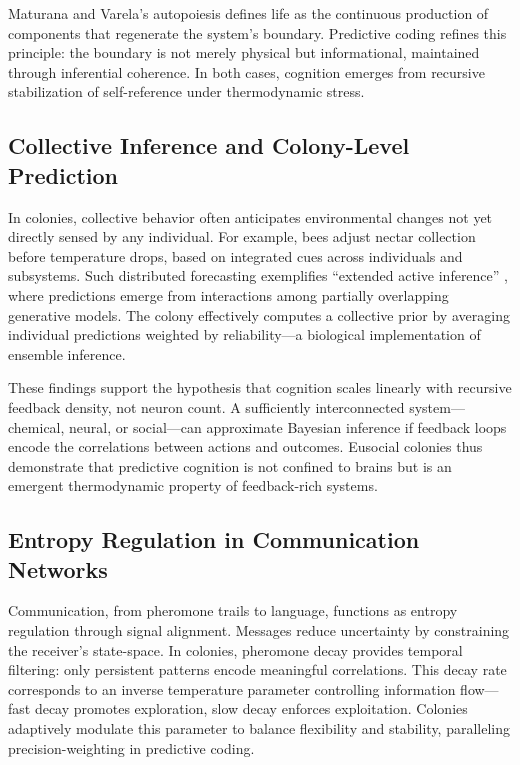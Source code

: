 \documentclass[11pt,a4paper]{article}
\begin{document}
Maturana and Varela’s autopoiesis \citep{MaturanaVarela1980Autopoiesis} defines life as the continuous production of components that regenerate the system’s boundary.  Predictive coding refines this principle: the boundary is not merely physical but informational, maintained through inferential coherence.  In both cases, cognition emerges from recursive stabilization of self-reference under thermodynamic stress.

\subsection{Collective Inference and Colony-Level Prediction}

In colonies, collective behavior often anticipates environmental changes not yet directly sensed by any individual.  For example, bees adjust nectar collection before temperature drops, based on integrated cues across individuals and subsystems.  Such distributed forecasting exemplifies “extended active inference” \citep{Constant2021EnactiveDynamicSocial}, where predictions emerge from interactions among partially overlapping generative models.  The colony effectively computes a collective prior by averaging individual predictions weighted by reliability—a biological implementation of ensemble inference.

These findings support the hypothesis that cognition scales linearly with recursive feedback density, not neuron count.  A sufficiently interconnected system—chemical, neural, or social—can approximate Bayesian inference if feedback loops encode the correlations between actions and outcomes.  Eusocial colonies thus demonstrate that predictive cognition is not confined to brains but is an emergent thermodynamic property of feedback-rich systems.

\subsection{Entropy Regulation in Communication Networks}

Communication, from pheromone trails to language, functions as entropy regulation through signal alignment.  Messages reduce uncertainty by constraining the receiver’s state-space.  In colonies, pheromone decay provides temporal filtering: only persistent patterns encode meaningful correlations.  This decay rate corresponds to an inverse temperature parameter controlling information flow—fast decay promotes exploration, slow decay enforces exploitation.  Colonies adaptively modulate this parameter to balance flexibility and stability, paralleling precision-weighting in predictive coding.
\end{document}
